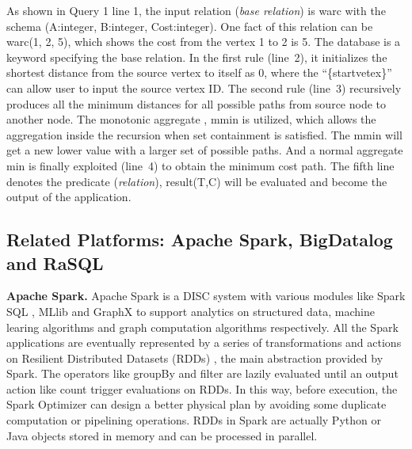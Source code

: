 As shown in Query 1 line 1, the input relation (\textit{base relation}) is \textsf{warc} with the schema \textsf{(A:integer, B:integer, Cost:integer)}. 
One fact of this relation can be \textsf{warc(1, 2, 5)}, which shows the  cost from   the vertex 1 to 2 is 5. The \textsf{database} is a keyword specifying the base relation.
In the first rule (line~2), it initializes the shortest distance from the source vertex to itself as 0, where the ``\{startvetex\}'' can allow user to input the source vertex ID. The second rule (line~3) recursively produces all the minimum distances for all possible paths from source node to another node. The monotonic aggregate \citep{zaniolo2019monotonic,das2019bigdata}, \textsf{mmin} is utilized, which allows the aggregation inside the recursion when set containment is satisfied. The \textsf{mmin} will get a new lower value with a larger set of possible paths. And a normal aggregate \textsf{min} is finally exploited (line~4) to obtain the minimum cost path. The fifth line denotes the  predicate (\textit{relation}), \textsf{result(T,C)} will be evaluated and become the output of the application.

\subsection{Related Platforms: Apache Spark, BigDatalog and RaSQL}
\textbf{Apache Spark.} Apache Spark is a DISC system with various modules like Spark SQL \citep{sparksql},  MLlib \citep{meng2016mllib} and GraphX \citep{gonzalez2014graphx} to support analytics on structured data, machine learing algorithms and graph computation algorithms respectively.  All the Spark applications are eventually represented by a series of transformations and actions on Resilient Distributed Datasets (RDDs) \citep{dean2004mapreduce}, the main abstraction provided by Spark. The operators like groupBy and filter are lazily evaluated until an output action like count trigger evaluations on RDDs. In this way, before execution, the Spark Optimizer can design a better physical plan by avoiding some duplicate computation or pipelining operations. RDDs in Spark are actually Python or Java objects stored in memory and can be processed in parallel. %

